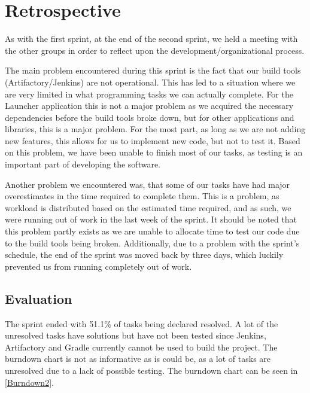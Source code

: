 \section{Retrospective}\label{S2Retro}
As with the first sprint, at the end of the second sprint, we held a meeting with
the other groups in order to reflect upon the development/organizational
process.\nl

The main problem encountered during this sprint is the fact that our build
tools (Artifactory/Jenkins) are not operational. This has led to a
situation where we are very limited in what programming tasks we can actually
complete. For the Launcher application this is not a major problem as we
acquired the necessary dependencies before the build tools broke down, but for
other applications and libraries, this is a major problem. For the most part, as
long as we are not adding new features, this allows for us to implement new
code, but not to test it. Based on this problem, we have been unable to finish
most of our tasks, as testing is an important part of developing the
software.\nl

Another problem we encountered was, that some of our tasks have had major
overestimates in the time required to complete them. This is a problem, as
workload is distributed based on the estimated time required, and as such, we
were running out of work in the last week of the sprint. It should be noted that
this problem partly exists as we are unable to allocate time to test our code
due to the build tools being broken. Additionally, due to a problem with the
sprint's schedule, the end of the sprint was moved back by three days, which
luckily prevented us from running completely out of work.

\subsection{Evaluation}
The sprint ended with 51.1\% of tasks being declared resolved. A lot of the
unresolved tasks have solutions but have not been tested since Jenkins,
Artifactory and Gradle currently cannot be used to build the project.
The burndown chart is not as informative as is could
be, as a lot of tasks are unresolved due to a lack of
possible testing. The burndown chart can be seen in \autoref{Burndown2}.






